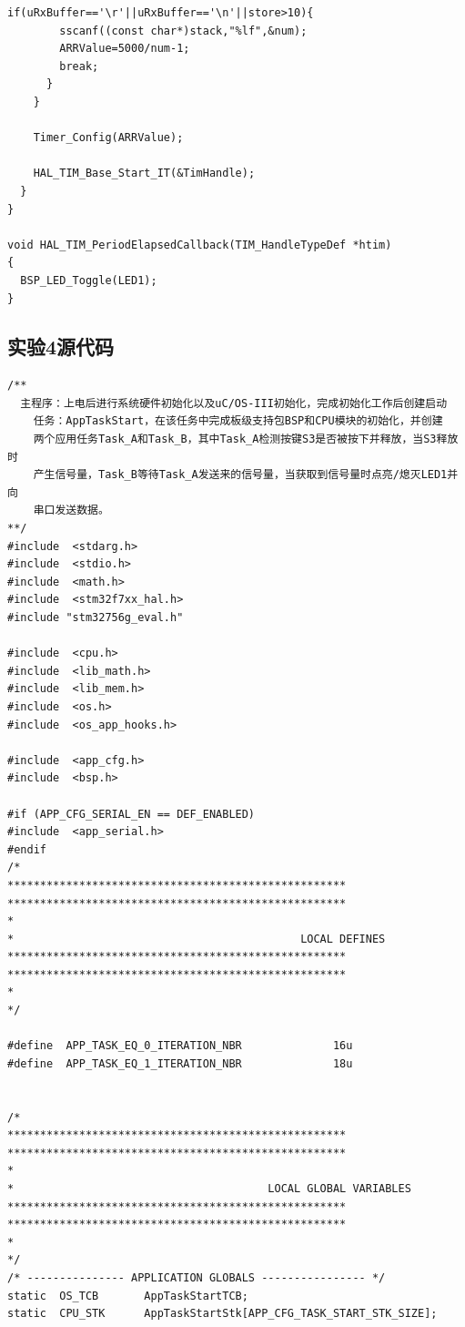﻿\documentclass[UTF8,12pt]{article}
\begin{document}
\begin{lstlisting}[frame=shadowbox]
      if(uRxBuffer=='\r'||uRxBuffer=='\n'||store>10){
        sscanf((const char*)stack,"%lf",&num);
        ARRValue=5000/num-1;
        break;
      }
    }

    Timer_Config(ARRValue);

    HAL_TIM_Base_Start_IT(&TimHandle);
  }
}

void HAL_TIM_PeriodElapsedCallback(TIM_HandleTypeDef *htim)
{
  BSP_LED_Toggle(LED1);
}

\end{lstlisting}

\newpage

\subsection{实验4源代码}
\begin{lstlisting}[frame=shadowbox]
/**
  主程序：上电后进行系统硬件初始化以及uC/OS-III初始化，完成初始化工作后创建启动
	任务：AppTaskStart，在该任务中完成板级支持包BSP和CPU模块的初始化，并创建
	两个应用任务Task_A和Task_B，其中Task_A检测按键S3是否被按下并释放，当S3释放时
	产生信号量，Task_B等待Task_A发送来的信号量，当获取到信号量时点亮/熄灭LED1并向
	串口发送数据。
**/
#include  <stdarg.h>
#include  <stdio.h>
#include  <math.h>
#include  <stm32f7xx_hal.h>
#include "stm32756g_eval.h"

#include  <cpu.h>
#include  <lib_math.h>
#include  <lib_mem.h>
#include  <os.h>
#include  <os_app_hooks.h>

#include  <app_cfg.h>
#include  <bsp.h>

#if (APP_CFG_SERIAL_EN == DEF_ENABLED)
#include  <app_serial.h>
#endif
/*
****************************************************
****************************************************
*
*                                            LOCAL DEFINES
****************************************************
****************************************************
*
*/

#define  APP_TASK_EQ_0_ITERATION_NBR              16u
#define  APP_TASK_EQ_1_ITERATION_NBR              18u


/*
****************************************************
****************************************************
*
*                                       LOCAL GLOBAL VARIABLES
****************************************************
****************************************************
*
*/
/* --------------- APPLICATION GLOBALS ---------------- */
static  OS_TCB       AppTaskStartTCB;
static  CPU_STK      AppTaskStartStk[APP_CFG_TASK_START_STK_SIZE];


\end{lstlisting}
\end{document}
